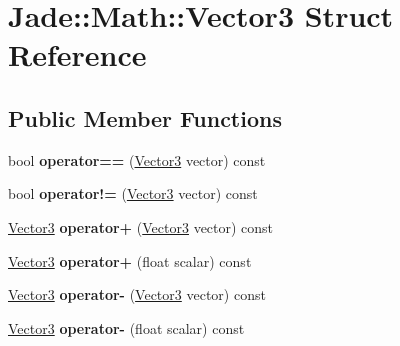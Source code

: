 \hypertarget{struct_jade_1_1_math_1_1_vector3}{}\section{Jade\+:\+:Math\+:\+:Vector3 Struct Reference}
\label{struct_jade_1_1_math_1_1_vector3}
\subsection*{Public Member Functions}
\begin{DoxyCompactItemize}
\item 
\hypertarget{struct_jade_1_1_math_1_1_vector3_a63e0f3bba35a37c3e3c551d8f3c855dd}{}bool {\bfseries operator==} (\hyperlink{struct_jade_1_1_math_1_1_vector3}{Vector3} vector) const \label{struct_jade_1_1_math_1_1_vector3_a63e0f3bba35a37c3e3c551d8f3c855dd}

\item 
\hypertarget{struct_jade_1_1_math_1_1_vector3_a9eef48f68a136c5778d1adf7d4cbee3f}{}bool {\bfseries operator!=} (\hyperlink{struct_jade_1_1_math_1_1_vector3}{Vector3} vector) const \label{struct_jade_1_1_math_1_1_vector3_a9eef48f68a136c5778d1adf7d4cbee3f}

\item 
\hypertarget{struct_jade_1_1_math_1_1_vector3_a52267470a1ecec61f21bf65908ac9531}{}\hyperlink{struct_jade_1_1_math_1_1_vector3}{Vector3} {\bfseries operator+} (\hyperlink{struct_jade_1_1_math_1_1_vector3}{Vector3} vector) const \label{struct_jade_1_1_math_1_1_vector3_a52267470a1ecec61f21bf65908ac9531}

\item 
\hypertarget{struct_jade_1_1_math_1_1_vector3_a0ccaaace3a48c57e212aae3b250b7917}{}\hyperlink{struct_jade_1_1_math_1_1_vector3}{Vector3} {\bfseries operator+} (float scalar) const \label{struct_jade_1_1_math_1_1_vector3_a0ccaaace3a48c57e212aae3b250b7917}

\item 
\hypertarget{struct_jade_1_1_math_1_1_vector3_a61d8011114aca01c5d6b1f1095d1c46f}{}\hyperlink{struct_jade_1_1_math_1_1_vector3}{Vector3} {\bfseries operator-\/} (\hyperlink{struct_jade_1_1_math_1_1_vector3}{Vector3} vector) const \label{struct_jade_1_1_math_1_1_vector3_a61d8011114aca01c5d6b1f1095d1c46f}

\item 
\hypertarget{struct_jade_1_1_math_1_1_vector3_a18406e34be8177201c91499976296990}{}\hyperlink{struct_jade_1_1_math_1_1_vector3}{Vector3} {\bfseries operator-\/} (float scalar) const \label{struct_jade_1_1_math_1_1_vector3_a18406e34be8177201c91499976296990}


\end{DoxyCompactItemize}
